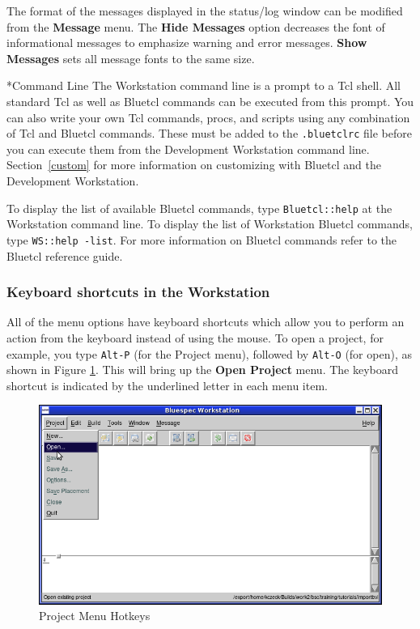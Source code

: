 \documentclass{article}
\makeatletter
\newcommand{\te}[1]{\texttt{#1}}
\def\subsubsubsection{\@startsection {subsubsubsection}{4}{\z@}{-3ex plus -1ex minus -.2ex}{1.25ex plus .2ex}{\normalsize\bf}*}
\makeatother
\begin{document}
The format of the messages displayed in the status/log window can be
modified from the {\bf Message} menu.
The {\bf Hide Messages}  option decreases the  font of
informational messages  to
emphasize  warning and error messages.   {\bf Show Messages} sets
all message fonts to the same size.


\subsubsubsection{Command Line}
The Workstation command line is a prompt to a Tcl shell.  All standard Tcl as well
 as  Bluetcl commands can be executed from this prompt.  You can
also write your own Tcl commands, procs, and scripts using any
combination of Tcl and Bluetcl commands.  These must be added to the
 \te{.bluetclrc} file before you
 can execute them from the Development Workstation command line.
 Section~\ref{custom} for more information on customizing with Bluetcl and  the
 Development Workstation.

To display the list of available Bluetcl commands, type
\te{Bluetcl::help} at the Workstation command line.  To display the
list of Workstation Bluetcl commands, type \te{WS::help -list}.  For
more information on Bluetcl commands refer to  the Bluetcl reference
guide.


\subsubsection{Keyboard shortcuts in the Workstation}

All of the menu options have keyboard shortcuts which allow you to
perform an action from the  keyboard instead of using the mouse.
To open a project, for example, you  type \te{Alt-P} (for the
Project menu), followed by \te{Alt-O} (for open), as shown in Figure \ref{fig-hotkey}.  This will bring up
the {\bf Open Project} menu.  The keyboard shortcut is indicated by
the underlined letter in each menu item.

\begin{figure}[ht]
\begin{center}
\includegraphics[width = 4 in]{figures/open}
\caption{Project Menu Hotkeys}
\label{fig-hotkey}
\end{center}
\end{figure}
\end{document}
